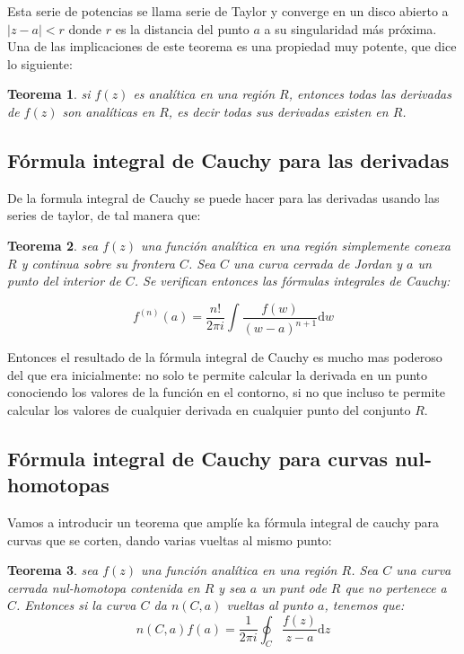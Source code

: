 \documentclass[12pt,a4paper]{book}
\newcommand{\D}{\mathrm{d}}
\newtheorem{theorem}{Teorema}[section]
\begin{document}
Esta serie de potencias se llama serie de Taylor y converge en un disco abierto a $|z-a|<r$ donde $r$ es la distancia del punto $a$ a su singularidad más próxima. Una de las implicaciones de este teorema es una propiedad muy potente, que dice lo siguiente:

\begin{theorem}
si $f(z)$ es analítica en una región $R$, entonces todas las derivadas de $f(z)$ son analíticas en $R$, es decir todas sus derivadas existen en $R$. 
\end{theorem}


\subsection{Fórmula integral de Cauchy para las derivadas}

De la formula integral de Cauchy se puede hacer para las derivadas usando las series de taylor, de tal manera que:


\begin{theorem}
sea $f(z)$ una función analítica en una región simplemente conexa $R$ y continua sobre su frontera $C$. Sea $C$ una curva cerrada de Jordan y $a$ un punto del interior de $C$. Se verifican entonces las fórmulas integrales de Cauchy:

$$ f^{(n)} (a) = \frac{n!}{2 \pi i} \int \frac{f(w)}{(w-a)^{n+1}} \D w $$
\end{theorem}


Entonces el resultado de la fórmula integral de Cauchy es mucho mas poderoso del que era inicialmente: no solo te permite calcular la derivada en un punto conociendo los valores de la función en el contorno, si no que incluso te permite calcular los valores de cualquier derivada en cualquier punto del conjunto $R$.  

\subsection{Fórmula integral de Cauchy para curvas nul-homotopas}

Vamos a introducir un teorema que amplíe ka fórmula integral de cauchy para curvas que se corten, dando varias vueltas al mismo punto:

\begin{theorem}
sea $f(z)$ una función analítica en una región $R$. Sea $C$ una curva cerrada nul-homotopa contenida en $R$ y sea $a$ un punt ode $R$ que no pertenece a $C$. Entonces si la curva $C$ da $n(C,a)$ vueltas al punto $a$, tenemos que:
$$ n(C,a) f(a) = \frac{1}{2 \pi i} \oint_C \frac{f(z)}{z-a} \D z $$
\end{theorem}
\end{document}
